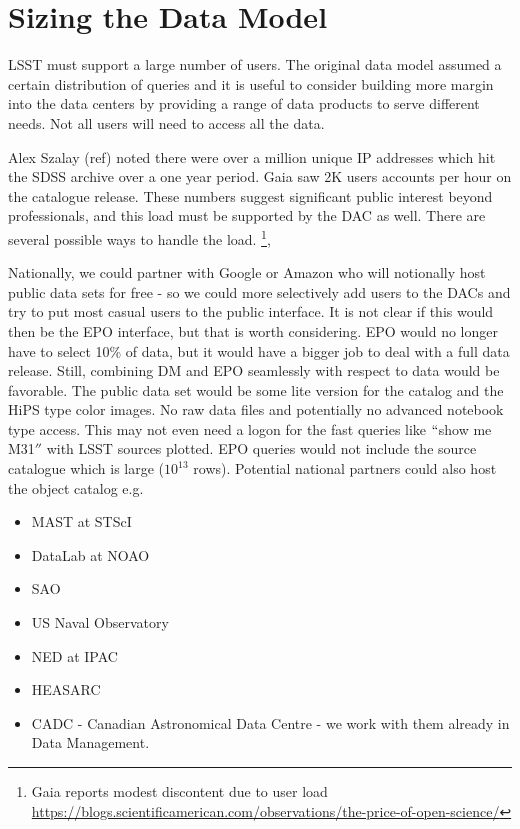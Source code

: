 \section{Sizing the Data Model}\label{sec:public}

LSST must support a large number of users. The original data model assumed a certain distribution of queries and it is useful to consider building more margin  into the data centers by providing a range of data products to serve different needs. Not all users will need to access all the data.

Alex Szalay (ref) noted there were over a million unique IP addresses which hit the SDSS archive over a one year period.  Gaia saw 2K users accounts per hour on the catalogue release. These numbers suggest significant public interest beyond professionals, and this load must be supported by the DAC as well. There are several possible ways to handle the load. 
\footnote{Gaia reports modest discontent due to user load \url{https://blogs.scientificamerican.com/observations/the-price-of-open-science/}},

Nationally, we could partner with Google or Amazon who will notionally host public data sets for free - so we could more selectively add users to the DACs and try to put most casual users to the public interface. It is not clear if this would then be the EPO interface, but that is worth considering. EPO would no longer have to select 10\% of data, but it would have a bigger job to deal with a full data release. Still, combining DM and EPO seamlessly with respect to data would be favorable.
The public data set would be some lite version for the catalog   and the HiPS type color images. No raw data files and potentially no advanced notebook type access. This may not even need a logon for the fast queries like $``$show me M31$''$ with LSST sources plotted. EPO queries would not include the source catalogue which is large ($10^{13}$ rows).
Potential national partners  could also host the object catalog e.g.

\begin{itemize}
 \item MAST at STScI
 \item DataLab at NOAO
 \item SAO
 \item US Naval Observatory
 \item NED at IPAC
 \item HEASARC
 \item CADC - Canadian Astronomical Data Centre - we work with them already in Data Management.
\end{itemize}

